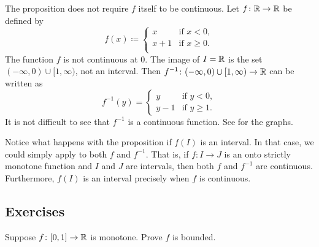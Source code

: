 \begin{example}
The proposition does not require $f$ itself to be continuous.  Let
$f \colon {\mathbb{R}} \to {\mathbb{R}}$ be defined by
\begin{equation*}
f(x) \coloneqq
\begin{cases}
x & \text{if } x < 0, \\
x+1 & \text{if } x \geq 0. \\
\end{cases}
\end{equation*}
The function $f$ is not continuous at $0$.
The image of $I = {\mathbb{R}}$ is the set 
$(-\infty,0)\cup [1,\infty)$, not an interval.
Then $f^{-1} \colon (-\infty,0)\cup [1,\infty)
\to {\mathbb{R}}$ can be written as
\begin{equation*}
f^{-1}(y) =
\begin{cases}
y & \text{if } y < 0, \\
y-1 & \text{if } y \geq 1. 
\end{cases}
\end{equation*}
It is not difficult to see that $f^{-1}$ is a continuous function.  See
 for the graphs.
\begin{myfigureht}
\caption{Graph of $f$ on the left and $f^{-1}$ on the right.\label{invcontfig}}
\end{myfigureht}
\end{example}

Notice what happens with the proposition if $f(I)$ is an interval.
In that case, we could simply
apply  to both $f$ and $f^{-1}$.  That is, if
$f \colon I \to J$ is an onto strictly monotone function and $I$ and $J$ are intervals,
then both $f$ and $f^{-1}$ are continuous.  Furthermore, $f(I)$ is an
interval precisely when $f$ is continuous.

\subsection{Exercises}

\begin{exercise}
Suppose $f \colon [0,1] \to {\mathbb{R}}$ is monotone.  Prove $f$ is bounded.
\end{exercise}

